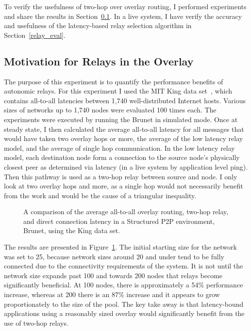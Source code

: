 To verify the usefulness of two-hop over overlay routing, I performed
experiments and share the results in Section~\ref{relay_motivation}.  In a live
system, I have verify the accuracy and usefulness of the latency-based relay
selection algorithm in Section~\ref{relay_eval}.

\subsection{Motivation for Relays in the Overlay}
\label{relay_motivation}

The purpose of this experiment is to quantify the performance benefits of
autonomic relays.  For this experiment I used the MIT King data
set~\cite{king_data}, which contains all-to-all latencies between 1,740
well-distributed Internet hosts.  Various sizes of networks up to 1,740 nodes
were evaluated 100 times each.  The experiments were executed by running the
Brunet in simulated mode.  Once at steady state, I then calculated the average
all-to-all latency for all messages that would have taken two overlay hops or
more, the average of the low latency relay model, and the average of single hop
communication.  In the low latency relay model, each destination node form a
connection to the source node's physically closest peer as determined via
latency (in a live system by application level ping).  Then this pathway is
used as a two-hop relay between source and node.  I only look at two overlay
hops and more, as a single hop would not necessarily benefit from the work and
would be the cause of a triangular inequality.  

\begin{figure}
\centering
{}
\caption[Motivation for relays]{A comparison of the average all-to-all overlay
routing, two-hop relay, and direct connection latency in a Structured P2P
environment, Brunet, using the King data set.}
\label{fig:simulated_relays}
\end{figure}

The results are presented in Figure~\ref{fig:simulated_relays}.  The initial
starting size for the network was set to 25, because network sizes around 20
and under tend to be fully connected due to the connectivity requirements of
the system.  It is not until the network size expands past 100 and towards 200
nodes that relays become significantly beneficial.  At 100 nodes, there is
approximately a 54\% performance increase, whereas at 200 there is an 87\%
increase and it appears to grow proportionately to the size of the pool.  The
key take away is that latency-bound applications using a reasonably sized
overlay would significantly benefit from the use of two-hop relays.

